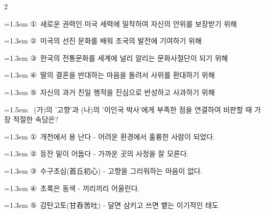 \documentclass[10pt, a4paper]{article}
\begin{document}
\begin{multicols}{2}
\begin{minipage}{\columnwidth}
\vspace{0.5mm}
{\hangindent=1.3em  \noindent\hspace{0.3em}①~새로운 권력인 미국 세력에 밀착하여 자신의 안위를 보장받기 위해\par}
{\hangindent=1.3em  \noindent\hspace{0.3em}②~미국의 선진 문화를 배워 조국의 발전에 기여하기 위해\par}
{\hangindent=1.3em  \noindent\hspace{0.3em}③~한국의 전통문화를 세계에 널리 알리는 문화사절단이 되기 위해\par}
{\hangindent=1.3em  \noindent\hspace{0.3em}④~딸의 결혼을 반대하는 마음을 돌려서 사위를 환대하기 위해\par}
{\hangindent=1.3em  \noindent\hspace{0.3em}⑤~자신의 과거 친일 행적을 진심으로 반성하고 사과하기 위해\par}
\vspace{4mm}
\end{minipage}
\par

\noindent\begin{minipage}{\columnwidth}
\vspace{2mm}
{\hangindent=1.5em  ~(가)의 '고향'과 (나)의 '이인국 박사'에게 부족한 점을 연결하여 비판할 때 가장 적절한 속담은?\par}

\vspace{0.5mm}
{\hangindent=1.3em  \noindent\hspace{0.3em}①~개천에서 용 난다 - 어려운 환경에서 훌륭한 사람이 되었다.\par}
{\hangindent=1.3em  \noindent\hspace{0.3em}②~등잔 밑이 어둡다 - 가까운 곳의 사정을 잘 모른다.\par}
{\hangindent=1.3em  \noindent\hspace{0.3em}③~수구초심(首丘初心) - 고향을 그리워하는 마음이 없다.\par}
{\hangindent=1.3em  \noindent\hspace{0.3em}④~초록은 동색 - 끼리끼리 어울린다.\par}
{\hangindent=1.3em  \noindent\hspace{0.3em}⑤~감탄고토(甘呑苦吐) - 달면 삼키고 쓰면 뱉는 이기적인 태도\par}
\vspace{4mm}
\end{minipage}
\par


\end{multicols}
\end{document}
